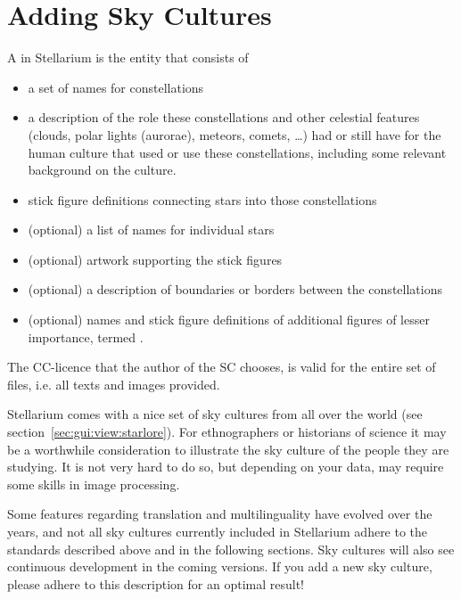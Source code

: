 

\chapter{Adding Sky Cultures}
\label{ch:SkyCultures}


A  in Stellarium is the entity that consists of 
\begin{itemize}
\item a set of names for constellations 
\item a description of the role these constellations and other celestial features (clouds, polar lights (aurorae), meteors, comets, \ldots) 
      had or still have for the human culture that used or use these constellations, including some relevant background on the culture.
\item stick figure definitions connecting stars into those constellations
\item (optional) a list of names for individual stars
\item (optional) artwork supporting the stick figures
\item (optional) a description of boundaries or borders between the constellations
\item (optional) names and stick figure definitions of additional figures of lesser importance, termed .
\end{itemize}
\noindent The CC-licence that the author of the SC chooses, is valid for the entire set of files, i.e. all texts and images provided.

Stellarium comes with a nice set of sky cultures from all
over the world (see section~\ref{sec:gui:view:starlore}). For ethnographers or
historians of science it may be a worthwhile consideration to
illustrate the sky culture of the people they are studying. It is not
very hard to do so, but depending on your data, may require some
skills in image processing.

Some features regarding translation and multilinguality have evolved
over the years, and not all sky cultures currently included in
Stellarium adhere to the standards described above and in the following
sections. Sky cultures will also see continuous development in the
coming versions. If you add a new sky culture, please adhere to this
description for an optimal result!


